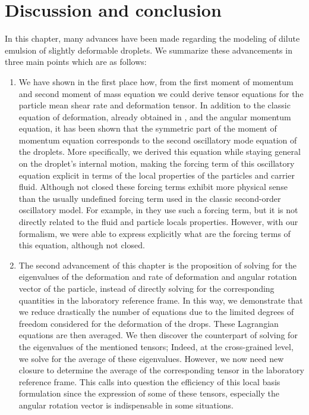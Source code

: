 \section{Discussion and conclusion}

In this chapter, many advances have been made regarding the modeling of dilute emulsion of slightly deformable droplets. 
We summarize these advancements in three main points which are as follows: 
\begin{enumerate}
    \item We have shown in the first place how, from the first moment of momentum and second moment of mass equation we could derive tensor equations for the particle mean shear rate and deformation tensor. 
In addition to the classic equation of deformation, already obtained in \citet{goddard1967nonlinear},  and the angular momentum equation, it has been shown that the symmetric part of the moment of momentum equation corresponds to the second oscillatory mode equation of the droplets. 
More specifically, we derived this equation while staying general on the droplet's internal motion, making the forcing term of this oscillatory equation explicit in terms of the local properties of the particles and carrier fluid. 
Although not closed these forcing terms exhibit more physical sense than the usually undefined forcing term used in the classic second-order oscillatory model.
For example, in \citet{riviere2021sub} they use such a forcing term, but it is not directly related to the fluid and particle locals properties.
However, with our formalism, we were able to express explicitly what are the forcing terms of this equation, although not closed. 

\item 
The second advancement of this chapter is the proposition of solving for the eigenvalues of the deformation and rate of deformation and angular rotation vector of the particle, instead of directly solving for the corresponding quantities in the laboratory reference frame. 
In this way, we demonstrate that we reduce drastically the number of equations due to the limited degrees of freedom considered for the deformation of the drops. 
These Lagrangian equations are then averaged. 
We then discover the counterpart of solving for the eigenvalues of the mentioned tensors; 
Indeed, at the cross-grained level, we solve for the average of these eigenvalues. 
However, we now need new closure to determine the average of the corresponding tensor in the laboratory reference frame.  
This calls into question the efficiency of this local basis formulation since the expression of some of these tensors, especially the angular rotation vector is indispensable in some situations. 


\end{enumerate}
